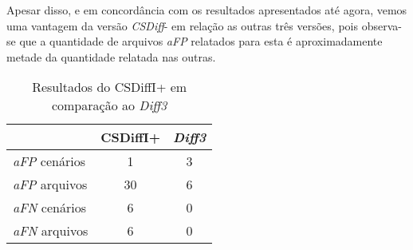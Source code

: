 Apesar disso, e em concordância com os resultados apresentados até agora, vemos
uma vantagem da versão \emph{CSDiff}- em relação as outras três versões, pois
observa-se que a quantidade de arquivos \emph{aFP} relatados para esta é
aproximadamente metade da quantidade relatada nas outras.

\begin{table}[ht]
	\begin{center}
		\begin{tabular}{|l|c|c|}
			\hline
			\textbf{ }          & \textbf{CSDiffI+} & \textbf{\emph{Diff3}} \\
			\hline
			\emph{aFP} cenários & 1                 & 3                     \\
			\emph{aFP} arquivos & 30                & 6                     \\
			\emph{aFN} cenários & 6                 & 0                     \\
			\emph{aFN} arquivos & 6                 & 0                     \\
			\hline
		\end{tabular}
	\end{center}
	\caption{Resultados do CSDiffI+ em comparação ao \emph{Diff3}}\label{csdiff_indentation_plus_afp_afn}
\end{table}

